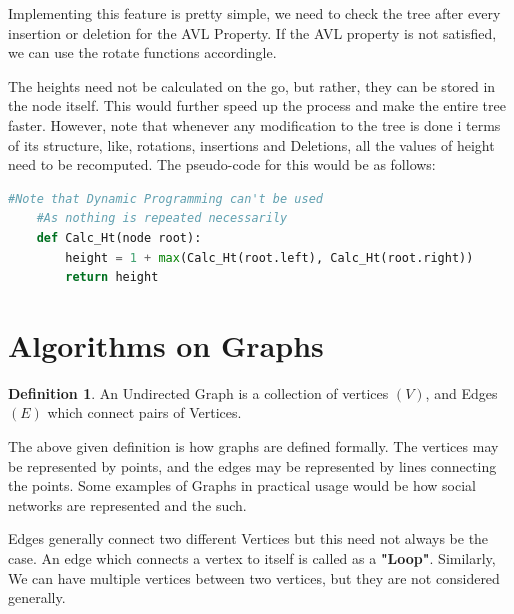 \documentclass{article}
\theoremstyle{definition}
\newtheorem*{definition}{Definition}
\theoremstyle{example}
\begin{document}
Implementing this feature is pretty simple, we need to check the tree after every insertion or deletion for the AVL Property. If the AVL property is not satisfied, we can use the rotate functions accordingle.\par
\vspace{4mm}
The heights need not be calculated on the go, but rather, they can be stored in the node itself. This would further speed up the process and make the entire tree faster. However, note that whenever any modification to the tree is done i terms of its structure, like, rotations, insertions and Deletions, all the values of height need to be recomputed. The pseudo-code for this would be as follows:
\vspace{3mm}
\begin{lstlisting}[language = python, basicstyle = \Large]
    #Note that Dynamic Programming can't be used
    #As nothing is repeated necessarily
    def Calc_Ht(node root):
        height = 1 + max(Calc_Ht(root.left), Calc_Ht(root.right))
        return height
\end{lstlisting}

\section{\Large Algorithms on Graphs}

\theoremstyle{definition}
\begin{definition}
    An Undirected Graph is a collection of vertices $(V)$, and Edges $(E)$ which connect pairs of Vertices.
\end{definition}

The above given definition is how graphs are defined formally. The vertices may be represented by points, and the edges may be represented by lines connecting the points. Some examples of Graphs in practical usage would be how social networks are represented and the such.\par
\vspace{4mm}
Edges generally connect two different Vertices but this need not always be the case. An edge which connects a vertex to itself is called as a \textbf{"Loop"}. Similarly, We can have multiple vertices between two vertices, but they are not considered generally.\par
\end{document}
